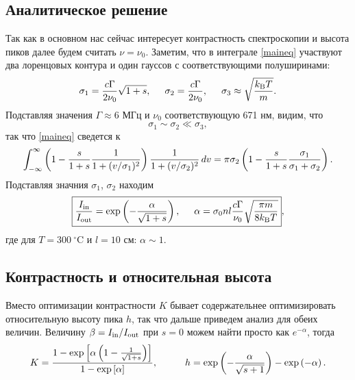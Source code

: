 \subsection{Аналитическое решение}

Так как в основном нас сейчас интересует контрастность спектроскопии и высота пиков далее будем считать $\nu = \nu_0$.
Заметим, что в интеграле \eqref{maineq} участвуют два лоренцовых контура и один гауссов с соответствующими полуширинами:
\begin{equation*}
    \sigma_1 = \frac{c \Gamma}{2 \nu_0}\sqrt{1 + s},
    \hspace{5 mm} 
    \sigma_2 = \frac{c \Gamma}{2 \nu_0},
    \hspace{5 mm} 
    \sigma_3 \approx \sqrt{\frac{k_{\textnormal{B}} T}{m}}.
\end{equation*}
Подставляя значения $\Gamma \approx 6$ МГц и $\nu_0$ соответствующую 671 нм, видим, что
\begin{equation*}
    \sigma_1 \sim \sigma_2 \ll \sigma_3,
\end{equation*}
так что \eqref{maineq} сведется к 
\begin{equation*}
    \int_{-\infty}^{\infty} \left(1 - \frac{s}{1+s} \frac{1}{1+(v/\sigma_1)^2}\right) \frac{1}{1+(v/\sigma_2)^2} \, d v = \pi \sigma_2 \left(1 - \frac{s}{1+s} \frac{\sigma_1}{\sigma_1 + \sigma_2}\right).
\end{equation*}
Подставляя значния $\sigma_1$, $\sigma_2$ находим
\begin{equation}
\boxed{
    \frac{I_{\textnormal{in}}}{I_{\textnormal{out}}} = \exp\left(
        -\frac{\alpha}{\sqrt{1+s}}
    \right), \hspace{5 mm} 
    \alpha = \sigma_0 n l \frac{c \Gamma}{\nu_0} \sqrt{\frac{\pi m}{8 k_{\textnormal{B}} T}}},
\end{equation}
где для $T = 300\ {}^\circ$C и $l=10$ см: $\alpha \sim 1$.



\subsection{Контрастность и относительная высота}

Вместо оптимизации контрастности $K$ бывает содержательнее оптимизировать относительную высоту пика $h$, так что дальше приведем анализ для обеих величин.
Величину $\beta = I_{\textnormal{in}}/I_{\textnormal{out}}$ при $s=0$ можем найти просто как $e^{-\alpha}$, тогда
\begin{equation*}
    K = \frac{1 - \exp\left[\alpha\left(1-\frac{1}{\sqrt{1+s}}\right)\right]}{1-\exp\left[\alpha\right]},
    \hspace{10 mm} 
    h = \exp\left({-\frac{\alpha }{\sqrt{s+1}}}\right)-\exp\left({-\alpha }\right).
\end{equation*}

